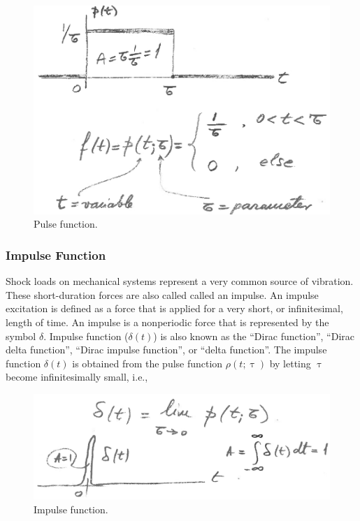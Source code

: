 \documentclass[12pt,letter]{article}
\begin{document}
\begin{figure}[H]
	\centering
	\includegraphics[width=5.5in]{../figures/pulse_function.png}
	\caption{Pulse function.}
\end{figure}

\subsubsection{Impulse Function}

Shock loads on mechanical systems represent a very common source of vibration. These short-duration forces are also called called an impulse. An impulse excitation is defined as a force that is applied for a very short, or infinitesimal, length of time. An impulse is a nonperiodic force that is represented by the symbol $\delta$. Impulse function ($\delta(t)$) is also known as the ``Dirac function'', ``Dirac delta function'', ``Dirac impulse function'', or ``delta function''. The impulse function $\delta(t)$ is obtained from the pulse function $\rho(t;\uptau)$ by letting $\uptau$ become infinitesimally small, i.e., 

\begin{figure}[H]
	\centering
	\includegraphics[width=5.5in]{../figures/impulse_function.png}
	\caption{Impulse function.}
\end{figure}
\end{document}

